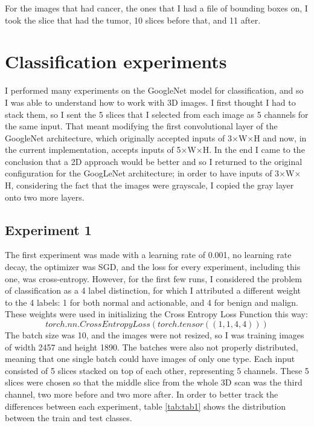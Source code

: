 For the images that had cancer, the ones that I had a file of bounding boxes on, I took the slice that had the tumor, 10 slices before that, and 11 after.

\section{Classification experiments}

I performed many experiments on the GoogleNet model for classification, and so I was able to understand how to work with 3D images. I first thought I had to stack them, so I sent the 5 slices that I selected from each image as 5 channels for the same input. That meant modifying the first convolutional layer of the GoogleNet architecture, which originally  accepted inputs of 3$\times$W$\times$H and now, in the current implementation, accepts inputs of 5$\times$W$\times$H. In the end I came to the conclusion that a 2D approach would be better and so I returned to the original configuration for the GoogLeNet architecture; in order to have inputs of 3$\times$W$\times$H, considering the fact that the images were grayscale, I copied the gray layer onto two more layers.

\subsection{Experiment 1}

The first experiment was made with a learning rate of 0.001, no learning rate decay, the optimizer was SGD, and the loss for every experiment, including this one, was cross-entropy. However, for the first few runs, I considered the problem of classification as a 4 label distinction, for which I attributed a different weight to the 4 labels: 1 for both normal and actionable, and 4 for benign and malign. These weights were used in initializing the Cross Entropy 
Loss Function this way:
\[torch.nn.CrossEntropyLoss(torch.tensor((1, 1, 4, 4)))\]
The batch size was 10, and the images were not resized, so I was training images of width 2457 and height 1890. The batches were also not properly distributed, meaning that one single batch could have images of only one type. Each input consisted of 5 slices stacked on top of each other, representing 5 channels. These 5 slices were chosen so that the middle slice from the whole 3D scan was the third channel, two more before and two more after. In order to better track the differences between each experiment, table \ref{tab:tab1} shows the distribution between the train and test classes.

